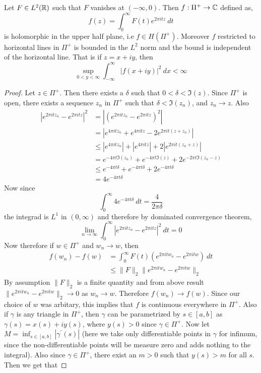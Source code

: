 \begin{proposition}
  \label{prop:fourier_transform_in_upper_half_plane}
  Let $F\in L^2(\mathbb R)$ such that $F$ vanishes at $(-\infty , 0)$. Then $f : \Pi^+ \to \mathbb C$ defined as, $$f(z) = \int_0^\infty F(t) e^{2\pi itz} \ dt$$
  is holomorphic in the upper half plane, i.e $f \in H(\Pi^+)$. Moreover $f$ restricted to horizontal lines in $\Pi^+$ is bounded in the  $L^2$ norm and the bound is independent of the horizontal line. That is if $z = x+iy$, then $$\sup_{0<y<\infty}\int_{-\infty}^\infty \left|f(x + iy)\right|^2 \ dx < \infty$$
\end{proposition}
\begin{proof}
  Let $z \in \Pi^+$. Then there exists a $\delta$ such that $0< \delta < \Im(z)$. Since $\Pi^+$ is open, there exists a sequence $z_n$ in $\Pi^+$ such that $\delta < \Im(z_n)$, and  $z_n \to z$. Also 
  \begin{align*}
    \left|e^{2 \pi itz_n} - e^{2\pi itz}\right|^2 &= \left|\left(e^{2\pi it z_n} - e^{2\pi itz}\right)^2\right| \\ 
    &= \left| e^{4\pi itz_n} + e^{4\pi itz} - 2e^{2\pi it(z+z_n)} \right| \\
    &\le \left|e^{4\pi itz_n}\right| + \left|e^{4\pi itz}\right| + 2\left|e^{2\pi it(z_n + z)}\right| \\
    &= e^{-4\pi t \Im(z_n)} + e^{-4 \pi t \Im(z)} + 2e^{-2\pi t \Im(z_n - z)} \\
    &\le e^{-4\pi t \delta} + e^{-4\pi t \delta} + 2e^{-4 \pi t\delta} \\
    &=4e^{-4\pi t \delta}
  \end{align*}
  Now since $$\int_0^\infty 4e^{-4\pi t\delta} \ dt = \frac{4}{2\pi \delta}$$
  the integrad is $L^1$ in $(0, \infty)$ and therefore by dominated convergence theorem, $$\lim_{n \to \infty} \int_0^\infty \left|e^{2\pi itz_n} - e^{2\pi itz}\right|^2 \ dt = 0$$
  Now therefore if $w \in \Pi^+$ and $w_n \to w$, then 
  \begin{align*}
    f(w_n) - f(w) &= \int_0^\infty F(t)(e^{2\pi it w_n} - e^{2\pi i tw}) \ dt \\
    & \le \|F\|_2 \|e^{2\pi itw_n} - e^{2\pi itw}\|_2
  \end{align*}
  By assumption $\|F\|_2$ is a finite quantity and from above result $\|e^{2\pi itw_n} - e^{2\pi itw}\|_2 \to 0$ as $w_n \to w$. Therefore $f(w_n) \to f(w)$. Since our choice of $w$ was arbitary, this implies that $f$ is continuous everywhere in $\Pi^+$. Also if $\gamma$ is any triangle in $\Pi^+$, then $\gamma$ can be parametrized by $s \in [a, b]$ as $\gamma(s) = x(s) + iy(s)$, where $y(s) >0$ since $\gamma \in \Pi^+$. Now let $M = \inf_{s \in [a,b]} |\gamma^{'}(s)|$ (here we take only differentiable points in $\gamma$ for infimum, since the non-differentiable points will be measure zero and adds nothing to the integral). Also since $\gamma \in \Pi^+$, there exist an $m >0$ such that $y(s) > m$ for all $s$. Then we get that

\end{proof}
